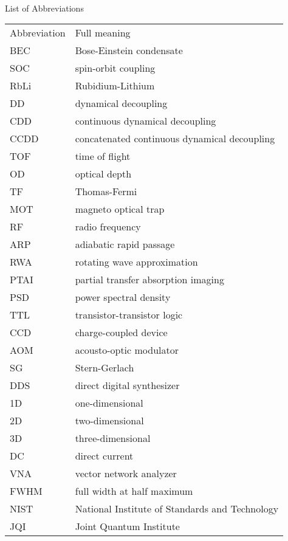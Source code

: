 
\renewcommand{\baselinestretch}{1}
\small\normalsize
\hbox{\ }

\vspace{-3em}


\begin{center}
\large{List of Abbreviations}
\end{center} 

\vspace{3pt}

\begin{tabular}{ll}
Abbreviation & Full meaning \\
BEC & Bose-Einstein condensate \\
SOC & spin-orbit coupling \\
RbLi & Rubidium-Lithium \\
DD & dynamical decoupling \\  
CDD & continuous dynamical decoupling \\
CCDD & concatenated continuous dynamical decoupling \\
TOF & time of flight \\
OD & optical depth \\
TF & Thomas-Fermi \\
MOT & magneto optical trap \\
RF & radio frequency \\
ARP & adiabatic rapid passage \\
RWA & rotating wave approximation \\
PTAI & partial transfer absorption imaging \\
PSD & power spectral density \\
TTL & transistor-transistor logic \\
CCD & charge-coupled device \\
AOM & acousto-optic modulator \\
SG & Stern-Gerlach \\
DDS & direct digital synthesizer \\
1D & one-dimensional \\
2D & two-dimensional \\
3D & three-dimensional \\
DC & direct current \\
VNA & vector network analyzer \\
FWHM & full width at half maximum \\
NIST & National Institute of Standards and Technology \\
JQI & Joint Quantum Institute
\end{tabular}
